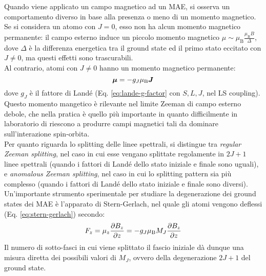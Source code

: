 Quando viene applicato un campo magnetico ad un MAE, si osserva un comportamento diverso in base alla presenza o meno di un momento magnetico. \\
Se si considera un atomo con $ J = 0 $, esso non ha alcun momento magnetico permanente: il campo esterno induce un piccolo momento magnetico $ \mu \sim \mu_\text{B} \frac{\mu_\text{B} B}{\Delta} $, dove $ \Delta $ è la differenza energetica tra il ground state ed il primo stato eccitato con $ J \neq 0 $, ma questi effetti sono trascurabili. \\
Al contrario, atomi con $ J \neq 0 $ hanno un momento magnetico permanente:
\begin{equation}
	\boldsymbol{\mu} = - g_J \mu_\text{B} \boldsymbol{J}
\end{equation}
dove $ g_J $ è il fattore di Landé (Eq. \ref{eq:lande-g-factor} con $ S,L,J $, nel LS coupling). Questo momento mangetico è rilevante nel limite Zeeman di campo esterno debole, che nella pratica è quello più importante in quanto difficilmente in laboratorio di riescono a produrre campi magnetici tali da dominare sull'interazione spin-orbita. \\
Per quanto riguarda lo splitting delle linee spettrali, si distingue tra \textit{regular Zeeman splitting}, nel caso in cui esse vengano splittate regolamente in $ 2J + 1 $ linee spettrali (quando i fattori di Landé dello stato iniziale e finale sono uguali), e \textit{anomalous Zeeman splitting}, nel caso in cui lo splitting pattern sia più complesso (quando i fattori di Landé dello stato iniziale e finale sono diversi). \\
Un'importante strumento sperimentale per studiare la degenerazione dei ground states dei MAE è l'apparato di Stern-Gerlach, nel quale gli atomi vengono deflessi (Eq. \ref{eq:stern-gerlach}) secondo:
\begin{equation*}
	F_z = \mu_z \frac{\partial B_z}{\partial z} = - g_J \mu_\text{B} M_J \frac{\partial B_z}{\partial z}
\end{equation*}
Il numero di sotto-fasci in cui viene splittato il fascio iniziale dà dunque una misura diretta dei possibili valori di $ M_J $, ovvero della degenerazione $ 2J + 1 $ del ground state.











